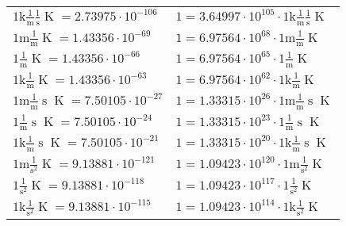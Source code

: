 \begin{center}
\begin{longtable}{l l}
{\color{gray}$1 \bm{\mathrm{ k}}\frac1{\operatorname{m}}\frac1{\operatorname{s}}{}{\operatorname{K}} = 2.73975\cdot10^{-106} $}   & {\color{gray}$ 1 = 3.64997\cdot10^{105} \cdot 1 \bm{\mathrm{ k}}\frac1{\operatorname{m}}\frac1{\operatorname{s}}{}{\operatorname{K}}$}  \\
{\color{gray}$1 \bm{\mathrm{ m}}\frac1{\operatorname{m}}{}{}{\operatorname{K}} = 1.43356\cdot10^{-69} $}   & {\color{gray}$ 1 = 6.97564\cdot10^{68} \cdot 1 \bm{\mathrm{ m}}\frac1{\operatorname{m}}{}{}{\operatorname{K}}$}  \\
{\color{black}$1 \bm{\mathrm{ }}\frac1{\operatorname{m}}{}{}{\operatorname{K}} = 1.43356\cdot10^{-66} $}   & {\color{black}$ 1 = 6.97564\cdot10^{65} \cdot 1 \bm{\mathrm{ }}\frac1{\operatorname{m}}{}{}{\operatorname{K}}$}  \\
{\color{gray}$1 \bm{\mathrm{ k}}\frac1{\operatorname{m}}{}{}{\operatorname{K}} = 1.43356\cdot10^{-63} $}   & {\color{gray}$ 1 = 6.97564\cdot10^{62} \cdot 1 \bm{\mathrm{ k}}\frac1{\operatorname{m}}{}{}{\operatorname{K}}$}  \\
{\color{gray}$1 \bm{\mathrm{ m}}\frac1{\operatorname{m}}{\operatorname{s}}{}{\operatorname{K}} = 7.50105\cdot10^{-27} $}   & {\color{gray}$ 1 = 1.33315\cdot10^{26} \cdot 1 \bm{\mathrm{ m}}\frac1{\operatorname{m}}{\operatorname{s}}{}{\operatorname{K}}$}  \\
{\color{black}$1 \bm{\mathrm{ }}\frac1{\operatorname{m}}{\operatorname{s}}{}{\operatorname{K}} = 7.50105\cdot10^{-24} $}   & {\color{black}$ 1 = 1.33315\cdot10^{23} \cdot 1 \bm{\mathrm{ }}\frac1{\operatorname{m}}{\operatorname{s}}{}{\operatorname{K}}$}  \\
{\color{gray}$1 \bm{\mathrm{ k}}\frac1{\operatorname{m}}{\operatorname{s}}{}{\operatorname{K}} = 7.50105\cdot10^{-21} $}   & {\color{gray}$ 1 = 1.33315\cdot10^{20} \cdot 1 \bm{\mathrm{ k}}\frac1{\operatorname{m}}{\operatorname{s}}{}{\operatorname{K}}$}  \\
{\color{gray}$1 \bm{\mathrm{ m}}{}\frac1{\operatorname{s}^2}{}{\operatorname{K}} = 9.13881\cdot10^{-121} $}   & {\color{gray}$ 1 = 1.09423\cdot10^{120} \cdot 1 \bm{\mathrm{ m}}{}\frac1{\operatorname{s}^2}{}{\operatorname{K}}$}  \\
{\color{black}$1 \bm{\mathrm{ }}{}\frac1{\operatorname{s}^2}{}{\operatorname{K}} = 9.13881\cdot10^{-118} $}   & {\color{black}$ 1 = 1.09423\cdot10^{117} \cdot 1 \bm{\mathrm{ }}{}\frac1{\operatorname{s}^2}{}{\operatorname{K}}$}  \\
{\color{gray}$1 \bm{\mathrm{ k}}{}\frac1{\operatorname{s}^2}{}{\operatorname{K}} = 9.13881\cdot10^{-115} $}   & {\color{gray}$ 1 = 1.09423\cdot10^{114} \cdot 1 \bm{\mathrm{ k}}{}\frac1{\operatorname{s}^2}{}{\operatorname{K}}$}  \\

\end{longtable}
\end{center}
